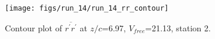 \begin{figure}[H]
\centering
\texttt{[image: figs/run\_14/run\_14\_rr\_contour]}
\caption{Contour plot of $\overline{r^\prime r^\prime}$ at $z/c$=6.97, $V_{free}$=21.13, station 2.}
\label{fig:run_14_rr_contour}
\end{figure}


